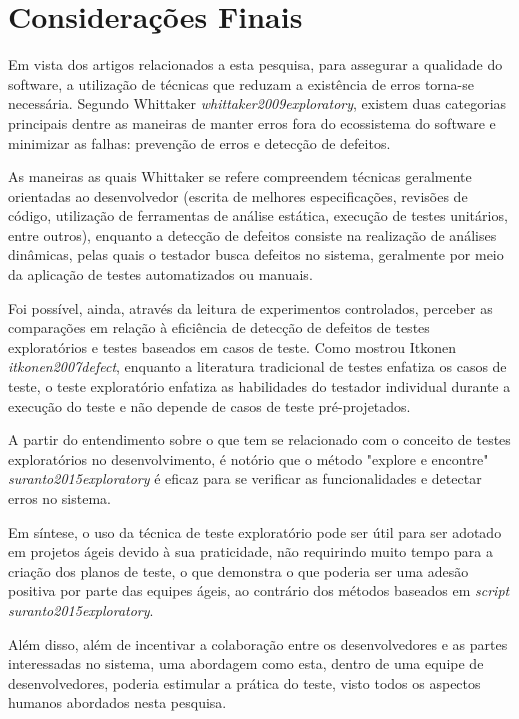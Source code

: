 \section{Considerações Finais}

Em vista dos artigos relacionados a esta pesquisa, para assegurar a qualidade do software, a utilização de técnicas que reduzam a existência de erros torna-se necessária. Segundo  Whittaker \textit{whittaker2009exploratory}, existem duas categorias principais dentre as maneiras de manter erros fora do ecossistema do software e minimizar as falhas: prevenção de erros e detecção de defeitos.

As maneiras as quais Whittaker se refere compreendem técnicas geralmente orientadas ao desenvolvedor (escrita de melhores especificações, revisões de código, utilização de ferramentas de análise estática, execução de testes unitários, entre outros), enquanto a detecção de defeitos consiste na realização de análises dinâmicas, pelas quais o testador busca defeitos no sistema, geralmente por meio da aplicação de testes automatizados ou manuais.

Foi possível, ainda, através da leitura de  experimentos controlados, perceber as comparações em relação à  eficiência de detecção de defeitos de testes exploratórios e testes baseados em casos de teste. Como mostrou Itkonen \textit{itkonen2007defect}, enquanto a literatura tradicional de testes enfatiza os casos de teste, o teste exploratório enfatiza as habilidades do testador individual durante a execução do teste e não depende de casos de teste pré-projetados.

A partir do entendimento sobre o que tem se relacionado com o conceito de testes exploratórios no desenvolvimento, é notório que o método "explore e encontre" \textit{suranto2015exploratory} é eficaz para se verificar as funcionalidades e detectar erros no sistema. 

Em síntese, o uso da técnica de teste exploratório pode ser útil para ser adotado em projetos ágeis devido à sua praticidade, não requirindo muito tempo para a criação dos planos de teste, o que demonstra o que poderia ser uma adesão positiva por parte das equipes ágeis, ao contrário dos métodos baseados em \textit{script} \textit{suranto2015exploratory}. 

Além disso, além de incentivar a colaboração entre os desenvolvedores e as partes interessadas no sistema, uma abordagem como esta, dentro de uma equipe de desenvolvedores, poderia estimular a prática do teste, visto todos os aspectos humanos abordados nesta pesquisa.	
